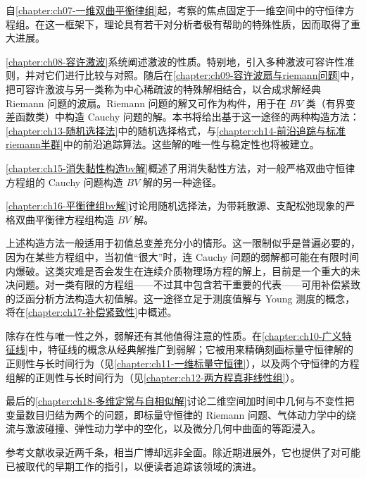 \documentclass[../../main.tex]{subfiles}
\begin{document}
自\cref{chapter:ch07-一维双曲平衡律组}起，考察的焦点固定于一维空间中的守恒律方程组。在这一框架下，理论具有若干对分析者极有帮助的特殊性质，因而取得了重大进展。

\cref{chapter:ch08-容许激波}系统阐述激波的性质。特别地，引入多种激波可容许性准则，并对它们进行比较与对照。随后在\cref{chapter:ch09-容许波扇与riemann问题}中，把可容许激波与另一类称为中心稀疏波的特殊解相结合，以合成求解经典 Riemann 问题的波扇。Riemann 问题的解又可作为构件，用于在 $BV$ 类（有界变差函数类）中构造 Cauchy 问题的解。本书将给出基于这一途径的两种构造方法：\cref{chapter:ch13-随机选择法}中的随机选择格式，与\cref{chapter:ch14-前沿追踪与标准riemann半群}中的前沿追踪算法。这些解的唯一性与稳定性也将被建立。

\cref{chapter:ch15-消失黏性构造bv解}概述了用消失黏性方法，对一般严格双曲守恒律方程组的 Cauchy 问题构造 $BV$ 解的另一种途径。

\cref{chapter:ch16-平衡律组bv解}讨论用随机选择法，为带耗散源、支配松弛现象的严格双曲平衡律方程组构造 $BV$ 解。

上述构造方法一般适用于初值总变差充分小的情形。这一限制似乎是普遍必要的，因为在某些方程组中，当初值“很大”时，连 Cauchy 问题的弱解都可能在有限时间内爆破。这类灾难是否会发生在连续介质物理场方程的解上，目前是一个重大的未决问题。对一类有限的方程组——不过其中包含若干重要的代表——可用补偿紧致的泛函分析方法构造大初值解。这一途径立足于测度值解与 Young 测度的概念，将在\cref{chapter:ch17-补偿紧致性}中概述。

除存在性与唯一性之外，弱解还有其他值得注意的性质。在\cref{chapter:ch10-广义特征线}中，特征线的概念从经典解推广到弱解；它被用来精确刻画标量守恒律解的正则性与长时间行为（见\cref{chapter:ch11-一维标量守恒律}），以及两个守恒律的方程组解的正则性与长时间行为（见\cref{chapter:ch12-两方程真非线性组}）。

最后的\cref{chapter:ch18-多维定常与自相似解}讨论二维空间加时间中几何与不变性把变量数目归结为两个的问题，即标量守恒律的 Riemann 问题、气体动力学中的绕流与激波碰撞、弹性动力学中的空化，以及微分几何中曲面的等距浸入。

参考文献收录近两千条，相当广博却远非全面。除近期进展外，它也提供了对可能已被取代的早期工作的指引，以便读者追踪该领域的演进。
\end{document}
